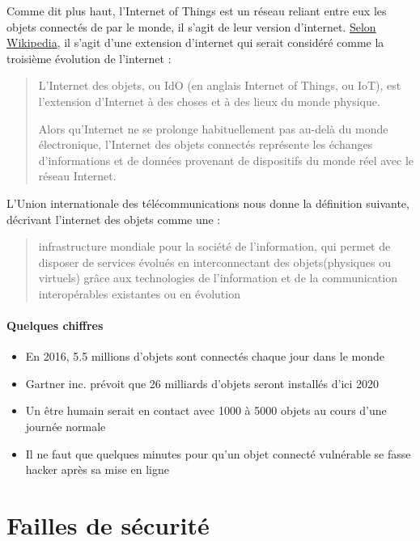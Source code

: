 \documentclass[a4paper]{report}
\begin{document}
	Comme dit plus haut, l'Internet of Things est un réseau reliant entre eux les objets connectés de par le monde, il s'agit de leur version
	d'internet. \href{https://fr.wikipedia.org/wiki/Internet_des_objets}{Selon Wikipedia}, il s'agit d'une extension d'internet qui serait
	considéré comme la troisième évolution de l'internet :
	\smallbreak
	\begin{quotation}
		L'Internet des objets, ou IdO (en anglais Internet of Things, ou IoT), est l'extension d'Internet à des choses et à des lieux du monde
		physique.

		Alors qu'Internet ne se prolonge habituellement pas au-delà du monde électronique, l'Internet des objets connectés représente les
		échanges d'informations et de données provenant de dispositifs du monde réel avec le réseau Internet.
	\end{quotation}
	
	\bigbreak
	
	L'Union internationale des télécommunications nous donne la définition suivante, décrivant l'internet des objets comme une :
	\begin{quotation}
		infrastructure mondiale pour la société de l'information, qui permet de disposer de services évolués en interconnectant 
		des objets(physiques ou virtuels) grâce aux technologies de l'information et de la communication interopérables existantes 
		ou en évolution
	\end{quotation}
	
	\medbreak	
	
	\paragraph{Quelques chiffres}
	\smallbreak
	\begin{itemize}
		\item En 2016, 5.5 millions d'objets sont connectés chaque jour dans le monde
		\item Gartner inc. prévoit que 26 milliards d'objets seront installés d'ici 2020
		\item Un être humain serait en contact avec 1000 à 5000 objets au cours d'une journée normale
		\item Il ne faut que quelques minutes pour qu'un objet connecté vulnérable se fasse hacker après sa mise en ligne
	\end{itemize}
	
	\newpage	
	
	\section{Failles de sécurité}
\end{document}
